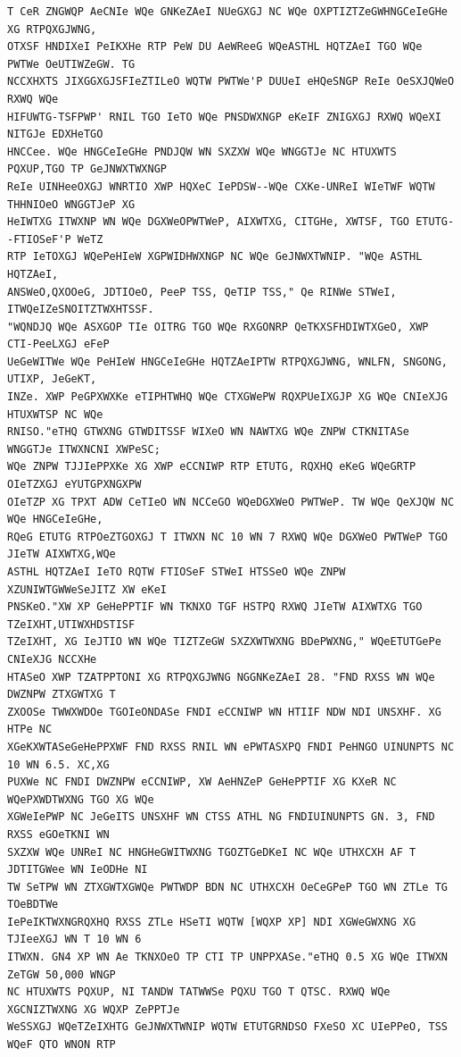 \documentclass[11pt,a4paper]{article}
\begin{document}
\begin{lstlisting}[style=ciphertext,caption={Complete text after iteration 1}]
T CeR ZNGWQP AeCNIe WQe GNKeZAeI NUeGXGJ NC WQe OXPTIZTZeGWHNGCeIeGHe XG RTPQXGJWNG,
OTXSF HNDIXeI PeIKXHe RTP PeW DU AeWReeG WQeASTHL HQTZAeI TGO WQe PWTWe OeUTIWZeGW. TG
NCCXHXTS JIXGGXGJSFIeZTILeO WQTW PWTWe'P DUUeI eHQeSNGP ReIe OeSXJQWeO RXWQ WQe
HIFUWTG-TSFPWP' RNIL TGO IeTO WQe PNSDWXNGP eKeIF ZNIGXGJ RXWQ WQeXI NITGJe EDXHeTGO
HNCCee. WQe HNGCeIeGHe PNDJQW WN SXZXW WQe WNGGTJe NC HTUXWTS PQXUP,TGO TP GeJNWXTWXNGP
ReIe UINHeeOXGJ WNRTIO XWP HQXeC IePDSW--WQe CXKe-UNReI WIeTWF WQTW THHNIOeO WNGGTJeP XG
HeIWTXG ITWXNP WN WQe DGXWeOPWTWeP, AIXWTXG, CITGHe, XWTSF, TGO ETUTG--FTIOSeF'P WeTZ
RTP IeTOXGJ WQePeHIeW XGPWIDHWXNGP NC WQe GeJNWXTWNIP. "WQe ASTHL HQTZAeI,
ANSWeO,QXOOeG, JDTIOeO, PeeP TSS, QeTIP TSS," Qe RINWe STWeI, ITWQeIZeSNOITZTWXHTSSF.
"WQNDJQ WQe ASXGOP TIe OITRG TGO WQe RXGONRP QeTKXSFHDIWTXGeO, XWP CTI-PeeLXGJ eFeP
UeGeWITWe WQe PeHIeW HNGCeIeGHe HQTZAeIPTW RTPQXGJWNG, WNLFN, SNGONG, UTIXP, JeGeKT,
INZe. XWP PeGPXWXKe eTIPHTWHQ WQe CTXGWePW RQXPUeIXGJP XG WQe CNIeXJG HTUXWTSP NC WQe
RNISO."eTHQ GTWXNG GTWDITSSF WIXeO WN NAWTXG WQe ZNPW CTKNITASe WNGGTJe ITWXNCNI XWPeSC;
WQe ZNPW TJJIePPXKe XG XWP eCCNIWP RTP ETUTG, RQXHQ eKeG WQeGRTP OIeTZXGJ eYUTGPXNGXPW
OIeTZP XG TPXT ADW CeTIeO WN NCCeGO WQeDGXWeO PWTWeP. TW WQe QeXJQW NC WQe HNGCeIeGHe,
RQeG ETUTG RTPOeZTGOXGJ T ITWXN NC 10 WN 7 RXWQ WQe DGXWeO PWTWeP TGO JIeTW AIXWTXG,WQe
ASTHL HQTZAeI IeTO RQTW FTIOSeF STWeI HTSSeO WQe ZNPW XZUNIWTGWWeSeJITZ XW eKeI
PNSKeO."XW XP GeHePPTIF WN TKNXO TGF HSTPQ RXWQ JIeTW AIXWTXG TGO TZeIXHT,UTIWXHDSTISF
TZeIXHT, XG IeJTIO WN WQe TIZTZeGW SXZXWTWXNG BDePWXNG," WQeETUTGePe CNIeXJG NCCXHe
HTASeO XWP TZATPPTONI XG RTPQXGJWNG NGGNKeZAeI 28. "FND RXSS WN WQe DWZNPW ZTXGWTXG T
ZXOOSe TWWXWDOe TGOIeONDASe FNDI eCCNIWP WN HTIIF NDW NDI UNSXHF. XG HTPe NC
XGeKXWTASeGeHePPXWF FND RXSS RNIL WN ePWTASXPQ FNDI PeHNGO UINUNPTS NC 10 WN 6.5. XC,XG
PUXWe NC FNDI DWZNPW eCCNIWP, XW AeHNZeP GeHePPTIF XG KXeR NC WQePXWDTWXNG TGO XG WQe
XGWeIePWP NC JeGeITS UNSXHF WN CTSS ATHL NG FNDIUINUNPTS GN. 3, FND RXSS eGOeTKNI WN
SXZXW WQe UNReI NC HNGHeGWITWXNG TGOZTGeDKeI NC WQe UTHXCXH AF T JDTITGWee WN IeODHe NI
TW SeTPW WN ZTXGWTXGWQe PWTWDP BDN NC UTHXCXH OeCeGPeP TGO WN ZTLe TG TOeBDTWe
IePeIKTWXNGRQXHQ RXSS ZTLe HSeTI WQTW [WQXP XP] NDI XGWeGWXNG XG TJIeeXGJ WN T 10 WN 6
ITWXN. GN4 XP WN Ae TKNXOeO TP CTI TP UNPPXASe."eTHQ 0.5 XG WQe ITWXN ZeTGW 50,000 WNGP
NC HTUXWTS PQXUP, NI TANDW TATWWSe PQXU TGO T QTSC. RXWQ WQe XGCNIZTWXNG XG WQXP ZePPTJe
WeSSXGJ WQeTZeIXHTG GeJNWXTWNIP WQTW ETUTGRNDSO FXeSO XC UIePPeO, TSS WQeF QTO WNON RTP

\end{lstlisting}
\end{document}
